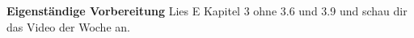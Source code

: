 \documentclass{uebung_cs}
\begin{document}
\textbf{Eigenständige Vorbereitung}
Lies  E Kapitel 3 ohne 3.6 und 3.9 und schau dir das  Video der Woche an.

\begin{aufgabe}[test]
\end{aufgabe}

\begin{aufgabe}[test]
\end{aufgabe}
\end{document}
